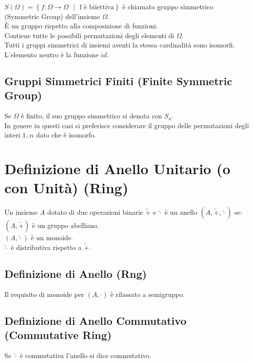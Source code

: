 \documentclass[a4paper, twoside, italian, 11pt]{book}
\newcommand{\braces}[1] {\left\{#1\right\}}
\begin{document}
$S(\Omega) = \braces{f : \Omega \rightarrow \Omega \text{ $|$ } \text{f è biiettiva}}$ è chiamato gruppo simmetrico (Symmetric Group) dell'insieme $\Omega$. \\

\noindent
È un gruppo rispetto alla composizione di funzioni. \\
Contiene tutte le possibili permutazioni degli elementi di $\Omega$. \\
Tutti i gruppi simmetrici di insiemi aventi la stessa cardinalità sono isomorfi. \\
L'elemento neutro è la funzione $id$.


\subsection{Gruppi Simmetrici Finiti (Finite Symmetric Group)}

Se $\Omega$ è finito, il suo gruppo simmetrico si denota con $S_n$. \\
In genere in questi casi si preferisce considerare il gruppo delle permutazioni degli interi $1..n$ dato che è isomorfo.


\section{Definizione di Anello Unitario (o con Unità) (Ring)}

Un insieme $A$ dotato di due operazioni binarie $\tilde{+}$ e $\tilde{\cdot}$ è un anello $(A, \tilde{+}, \tilde{\cdot})$ se: \\

$(A, \tilde{+})$ è un gruppo abelliano. \\
\indent
$(A, \tilde{\cdot})$ è un monoide. \\
\indent
$\tilde{\cdot}$ è distributiva rispetto a $\tilde{+}$.


\subsection{Definizione di Anello (Rng)}

Il requisito di monoide per $(A, \cdot)$ è rilassato a semigruppo.


\subsection{Definizione di Anello Commutativo (Commutative Ring)}

Se $\tilde{\cdot}$ è commutativa l'anello si dice commutativo.
\end{document}
